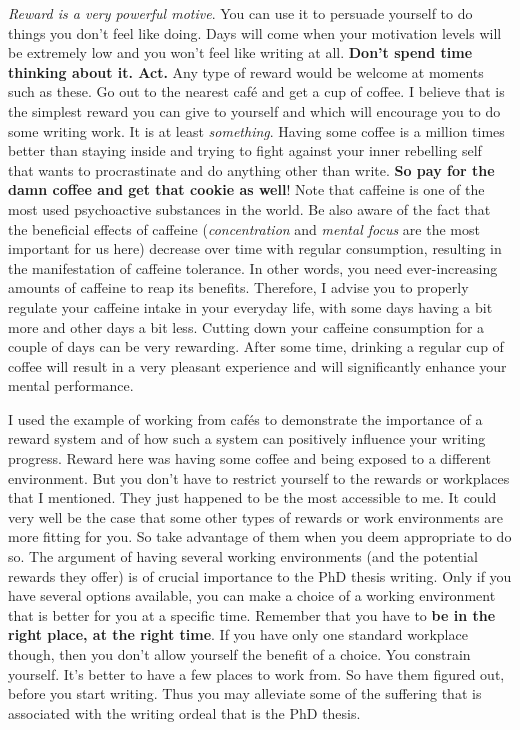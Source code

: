 \documentclass[
  12pt,
  oneside]{book}
\begin{document}
\emph{Reward is a very powerful motive}.
You can use it to persuade yourself to do things you don't feel like doing.
Days will come when your motivation levels will be extremely low and you won't feel like writing at all.
\textbf{Don't spend time thinking about it.
Act.}
Any type of reward would be welcome at moments such as these.
Go out to the nearest café and get a cup of coffee.
I believe that is the simplest reward you can give to yourself and which will encourage you to do some writing work.
It is at least \emph{something}.
Having some coffee is a million times better than staying inside and trying to fight against your inner rebelling self that wants to procrastinate and do anything other than write.
\textbf{So pay for the damn coffee and get that cookie as well}!
Note that caffeine is one of the most used psychoactive substances in the world.
Be also aware of the fact that the beneficial effects of caffeine (\emph{concentration} and \emph{mental focus} are the most important for us here) decrease over time with regular consumption, resulting in the manifestation of caffeine tolerance.
In other words, you need ever-increasing amounts of caffeine to reap its benefits.
Therefore, I advise you to properly regulate your caffeine intake in your everyday life, with some days having a bit more and other days a bit less.
Cutting down your caffeine consumption for a couple of days can be very rewarding.
After some time, drinking a regular cup of coffee will result in a very pleasant experience and will significantly enhance your mental performance.

I used the example of working from cafés to demonstrate the importance of a reward system and of how such a system can positively influence your writing progress.
Reward here was having some coffee and being exposed to a different environment.
But you don't have to restrict yourself to the rewards or workplaces that I mentioned.
They just happened to be the most accessible to me.
It could very well be the case that some other types of rewards or work environments are more fitting for you.
So take advantage of them when you deem appropriate to do so.
The argument of having several working environments (and the potential rewards they offer) is of crucial importance to the PhD thesis writing.
Only if you have several options available, you can make a choice of a working environment that is better for you at a specific time.
Remember that you have to \textbf{be in the right place, at the right time}.
If you have only one standard workplace though, then you don't allow yourself the benefit of a choice.
You constrain yourself.
It's better to have a few places to work from.
So have them figured out, before you start writing.
Thus you may alleviate some of the suffering that is associated with the writing ordeal that is the PhD thesis.
\end{document}

